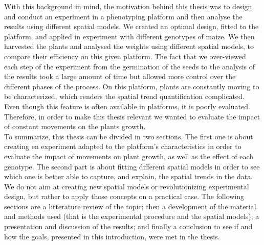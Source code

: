 With this background in mind, the motivation behind this thesis was to design and conduct an experiment in a phenotyping platform and then analyse the results using different spatial models. We created an optimal design, fitted to the platform, and applied in experiment with different genotypes of maize. We then harvested the plants and analysed the weights using different spatial models, to compare their efficiency on this given platform. The fact that we over-viewed each step of the experiment from the germination of the seeds to the analysis of the results took a large amount of time but allowed more control over the different phases of the process. 
On this platform, plants are constantly moving to be characterized, which renders the spatial trend quantification complicated. Even though this feature is often available in platforms, it is poorly evaluated. Therefore, in order to make this thesis relevant we wanted to evaluate the impact of constant movements on the plants growth.\\ 


To summarize, this thesis can be divided in two sections. The first one is about creating en experiment adapted to the platform's characteristics in order to evaluate the impact of movements on plant growth, as well as the effect of each genotype. The second part is about fitting different spatial models in order to see which one is better able to capture, and explain, the spatial trends in the data. We do not aim at creating new spatial models or revolutionizing experimental design, but rather to apply those concepts on a practical case. The following sections are a litterature review of the topic; then a development of the material and methods used (that is the experimental procedure and the spatial models); a presentation and discussion of the results; and finally a conclusion to see if and how the goals, presented in this introduction, were met in the thesis. 
